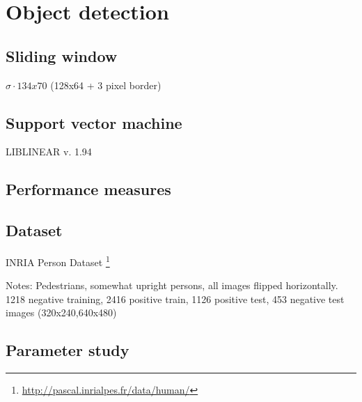 \documentclass[thesis.tex]{subfiles}
\begin{document}
\chapter{Object detection}
\label{sec:od}

\section{Sliding window}

$\sigma \cdot 134x70$ (128x64 + 3 pixel border)

\section{Support vector machine}

LIBLINEAR v. 1.94 \cite{fan2008liblinear}


\section{Performance measures}

\section{Dataset}
\label{sec:odDataset}

INRIA Person Dataset \footnote{\url{http://pascal.inrialpes.fr/data/human/}} \cite{dalal2005histograms}

Notes: Pedestrians, somewhat upright persons, all images flipped horizontally.
1218 negative training, 2416 positive train, 1126 positive test, 453 negative test images (320x240,640x480)

\section{Parameter study}
\label{sec:odParameterStudy}

\subbibliography
\end{document}
